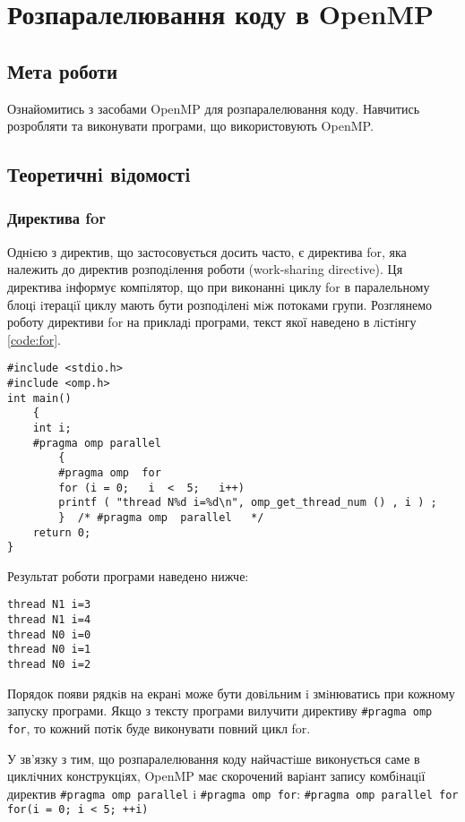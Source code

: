 \chapter{Розпаралелювання коду в OpenMP}
\nopagebreak[4]
\section*{Мета роботи}
Ознайомитись з засобами OpenMP для розпаралелювання коду. Навчитись розробляти та виконувати програми, що використовують OpenMP.

\nopagebreak[4]
\section{Теоретичнi вiдомостi}
\subsection*{Директива for}
\nopagebreak[4]

Однiєю з директив, що застосовується досить часто, є директива for, яка належить до директив розподiлення роботи (work-sharing directive). Ця директива iнформує компiлятор, що при виконаннi циклу for в паралельному блоцi iтерацiї циклу мають бути розподiленi мiж потоками групи. Розглянемо роботу директиви for на прикладi програми, текст якої наведено в лiстiнгу \ref{code:for}.

\begin{lstlisting}[label=code:for,caption=Застосування директиви for]
#include <stdio.h>
#include <omp.h> 
int main() 
	{
	int i;
	#pragma omp parallel
		{ 
		#pragma omp  for
		for (i = 0;   i  <  5;   i++)
		printf ( "thread N%d i=%d\n", omp_get_thread_num () , i ) ;
		}  /* #pragma omp  parallel   */
	return 0;
}
\end{lstlisting}
Результат роботи програми наведено нижче:

\begin{verbatim}
thread N1 i=3 
thread N1 i=4 
thread N0 i=0 
thread N0 i=1 
thread N0 i=2
\end{verbatim}

Порядок появи рядкiв на екранi може бути довiльним i змiнюватись при кожному запуску програми. Якщо з тексту програми вилучити директиву \verb'#pragma omp for', то кожний потiк буде виконувати повний цикл for.

У зв’язку з тим, що розпаралелювання коду найчастiше виконується саме в циклiчних конструкцiях, OpenMP має скорочений варiант запису комбiнацiї директив  \verb'#pragma omp parallel' i \verb'#pragma omp for':
\verb'#pragma omp parallel for for(i = 0; i < 5; ++i)'


